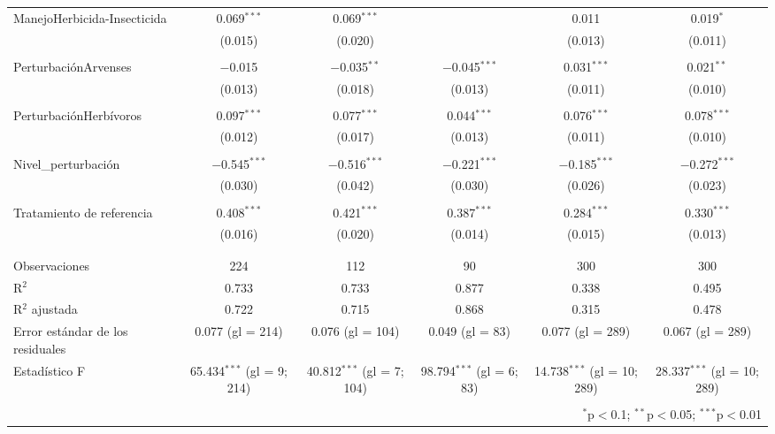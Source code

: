 \documentclass[spanish,11pt]{article}
\begin{document}
\begin{table}[!htbp]
\begin{tabular}{@{\extracolsep{5pt}}lccccc}
 ManejoHerbicida-Insecticida & 0.069$^{***}$ & 0.069$^{***}$ &  & 0.011 & 0.019$^{*}$ \\ 
  & (0.015) & (0.020) &  & (0.013) & (0.011) \\ 
  & & & & & \\ 
 PerturbaciónArvenses & $-$0.015 & $-$0.035$^{**}$ & $-$0.045$^{***}$ & 0.031$^{***}$ & 0.021$^{**}$ \\ 
  & (0.013) & (0.018) & (0.013) & (0.011) & (0.010) \\ 
  & & & & & \\ 
 PerturbaciónHerbívoros & 0.097$^{***}$ & 0.077$^{***}$ & 0.044$^{***}$ & 0.076$^{***}$ & 0.078$^{***}$ \\ 
  & (0.012) & (0.017) & (0.013) & (0.011) & (0.010) \\ 
  & & & & & \\ 
 Nivel\_perturbación & $-$0.545$^{***}$ & $-$0.516$^{***}$ & $-$0.221$^{***}$ & $-$0.185$^{***}$ & $-$0.272$^{***}$ \\ 
  & (0.030) & (0.042) & (0.030) & (0.026) & (0.023) \\ 
  & & & & & \\ 
 Tratamiento de referencia & 0.408$^{***}$ & 0.421$^{***}$ & 0.387$^{***}$ & 0.284$^{***}$ & 0.330$^{***}$ \\ 
  & (0.016) & (0.020) & (0.014) & (0.015) & (0.013) \\ 
  & & & & & \\ 
\hline \\[-1.8ex] 
Observaciones & 224 & 112 & 90 & 300 & 300 \\ 
R$^{2}$ & 0.733 & 0.733 & 0.877 & 0.338 & 0.495 \\ 
R$^{2}$ ajustada & 0.722 & 0.715 & 0.868 & 0.315 & 0.478 \\ 
Error estándar de los residuales & 0.077 (gl = 214) & 0.076 (gl = 104) & 0.049 (gl = 83) & 0.077 (gl = 289) & 0.067 (gl = 289) \\ 
Estadístico F & 65.434$^{***}$ (gl = 9; 214) & 40.812$^{***}$ (gl = 7; 104) & 98.794$^{***}$ (gl = 6; 83) & 14.738$^{***}$ (gl = 10; 289) & 28.337$^{***}$ (gl = 10; 289) \\ 
\hline 
\hline \\[-1.8ex] 
\multicolumn{6}{r}{$^{*}$p$<$0.1; $^{**}$p$<$0.05; $^{***}$p$<$0.01} \\ 
\end{tabular} 
\end{table} 
\end{document}

